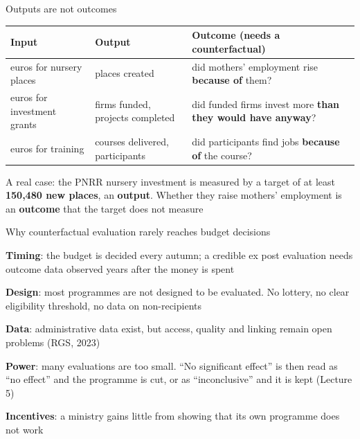 \documentclass[aspectratio=169,xcolor=table]{beamer}
\begin{document}
\begin{frame}{Outputs are not outcomes}
\centering\small
\begin{tabular}{L{3.6cm}L{3.6cm}L{4.6cm}}
\toprule
\textbf{Input} & \textbf{Output} & \textbf{Outcome (needs a counterfactual)} \\
\midrule
euros for nursery places & places created & did mothers' employment rise \textbf{because of} them? \\
euros for investment grants & firms funded, projects completed & did funded firms invest more \textbf{than they would have anyway}? \\
euros for training & courses delivered, participants & did participants find jobs \textbf{because of} the course? \\
\bottomrule
\end{tabular}
\vspace{0.3cm}

\raggedright
A real case: the PNRR nursery investment is measured by a target of at least \textbf{150,480 new places}, an \textbf{output}. Whether they raise mothers' employment is an \textbf{outcome} that the target does not measure
\end{frame}

\begin{frame}{Why counterfactual evaluation rarely reaches budget decisions}
\bi
  \item \textbf{Timing}: the budget is decided every autumn; a credible ex post evaluation needs outcome data observed years after the money is spent
  \item \textbf{Design}: most programmes are not designed to be evaluated. No lottery, no clear eligibility threshold, no data on non-recipients
  \item \textbf{Data}: administrative data exist, but access, quality and linking remain open problems (RGS, 2023)
  \item \textbf{Power}: many evaluations are too small. ``No significant effect'' is then read as ``no effect'' and the programme is cut, or as ``inconclusive'' and it is kept (Lecture 5)
  \item \textbf{Incentives}: a ministry gains little from showing that its own programme does not work
\ei
{}
\end{frame}
\end{document}
